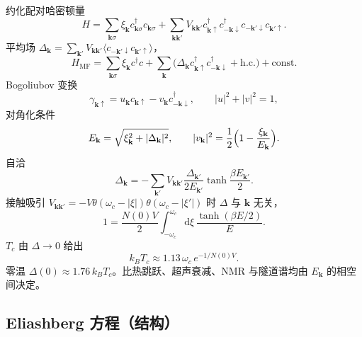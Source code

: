 约化配对哈密顿量
\begin{equation}
  H
  =\sum_{\mathbf{k}\sigma}\xi_{\mathbf{k}}c_{\mathbf{k}\sigma}^\dagger c_{\mathbf{k}\sigma}
  +\sum_{\mathbf{k}\mathbf{k}'}
  V_{\mathbf{k}\mathbf{k}'}
  c_{\mathbf{k}\uparrow}^\dagger c_{-\mathbf{k}\downarrow}^\dagger
  c_{-\mathbf{k}'\downarrow}c_{\mathbf{k}'\uparrow}.
\end{equation}
平均场 $\Delta_{\mathbf{k}}=\sum_{\mathbf{k}'}V_{\mathbf{k}\mathbf{k}'}\langle c_{-\mathbf{k}'\downarrow}c_{\mathbf{k}'\uparrow}\rangle$，
\begin{equation}
  H_{\mathrm{MF}}
  =\sum_{\mathbf{k}\sigma}\xi_{\mathbf{k}}c^\dagger c
  +\sum_{\mathbf{k}}
  \bigl(
  \Delta_{\mathbf{k}}c_{\mathbf{k}\uparrow}^\dagger c_{-\mathbf{k}\downarrow}^\dagger
  +\mathrm{h.c.}
  \bigr)
  +\mathrm{const}.
\end{equation}
Bogoliubov 变换
\begin{equation}
  \gamma_{\mathbf{k}\uparrow}
  =u_{\mathbf{k}}c_{\mathbf{k}\uparrow}-v_{\mathbf{k}}c_{-\mathbf{k}\downarrow}^\dagger,
  \qquad
  |u|^2+|v|^2=1,
\end{equation}
对角化条件
\begin{equation}
  E_{\mathbf{k}}
  =\sqrt{\xi_{\mathbf{k}}^2+|\Delta_{\mathbf{k}}|^2},
  \qquad
  |v_{\mathbf{k}}|^2
  =\frac12\Bigl(1-\frac{\xi_{\mathbf{k}}}{E_{\mathbf{k}}}\Bigr).
\end{equation}
自洽
\begin{equation}
  \Delta_{\mathbf{k}}
  =-\sum_{\mathbf{k}'}
  V_{\mathbf{k}\mathbf{k}'}
  \frac{\Delta_{\mathbf{k}'}}{2E_{\mathbf{k}'}}
  \tanh\frac{\beta E_{\mathbf{k}'}}{2}.
\label{eq:gap}
\end{equation}
接触吸引 $V_{\mathbf{k}\mathbf{k}'}=-V\theta(\omega_c-|\xi|)\theta(\omega_c-|\xi'|)$ 时 $\Delta$ 与 $\mathbf{k}$ 无关，
\begin{equation}
  1
  =\frac{N(0)V}{2}
  \int_{-\omega_c}^{\omega_c}
  \mathrm{d}\xi\,
  \frac{\tanh(\beta E/2)}{E}.
\end{equation}
$T_c$ 由 $\Delta\to0$ 给出
\begin{equation}
  k_BT_c
  \approx 1.13\,\omega_c\,e^{-1/N(0)V}.
\end{equation}
零温 $\Delta(0)\approx1.76\,k_BT_c$。比热跳跃、超声衰减、NMR 与隧道谱均由 $E_{\mathbf{k}}$ 的相空间决定。

\subsection{Eliashberg 方程（结构）}

